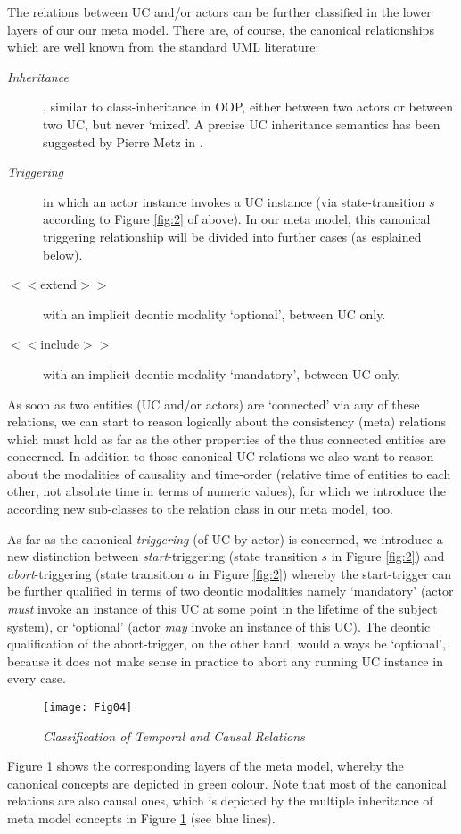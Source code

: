 The relations between UC and/or actors can be further classified 
in the lower layers of our our meta model. There are, of course, 
the canonical relationships which are well known from the standard 
UML literature:
\begin{description}
\item[\it Inheritance], similar to class-inheritance in OOP, 
 either between two actors or between two UC, but never `mixed'.
 A precise UC inheritance semantics has been suggested by Pierre 
 Metz in \cite{Metz-PhD}.
\item[\it Triggering] in which an actor instance invokes a UC instance 
(via state-transition $s$ according to Figure \ref{fig:2} of above). In 
our meta model, this canonical triggering relationship will be divided 
into further cases (as esplained below).
\item[$<<$extend$>>$] with an implicit deontic modality `optional', 
 between UC only.
\item[$<<$include$>>$] with an implicit deontic modality `mandatory', 
 between UC only.
\end{description}
As soon as two entities (UC and/or actors) are `connected' via any of 
these relations, we can start to reason logically about the consistency 
(meta) relations which must hold as far as the other properties of the 
thus connected entities are concerned. In addition to those canonical 
UC relations we also want to reason about the modalities of causality 
and time-order (relative time of entities to each other, not absolute 
time in terms of numeric values), for which we introduce the according 
new sub-classes to the relation class in our meta model, too. 

As far as the canonical \emph{triggering} (of UC by actor) is concerned, 
we introduce a new distinction between \emph{start}-triggering (state 
transition $s$ in Figure \ref{fig:2}) and \emph{abort}-triggering (state 
transition $a$ in Figure \ref{fig:2}) whereby the start-trigger can be 
further qualified in terms of two deontic modalities name\-ly `mandatory' 
(actor \emph{must} invoke an instance of this UC at some point in the 
lifetime of the subject system), or `optional' (actor \emph{may} invoke 
an instance of this UC). The deontic qualification of the abort-trigger, 
on the other hand, would always be `optional', because it does not make 
sense in practice to abort any running UC instance in every case. 

\begin{figure}[t!]
\begin{center}
\texttt{[image: Fig04]}\\   
\caption{\it Classification of Temporal and Causal Relations}
\label{fig:4} 
\end{center} 
\end{figure}
Figure \ref{fig:4} shows the corresponding layers of the meta model,
whereby the canonical concepts are depicted in green colour. Note 
that most of the canonical relations are also causal ones, which is 
depicted by the multiple inheritance of meta model concepts in Figure 
\ref{fig:4} (see blue lines).

